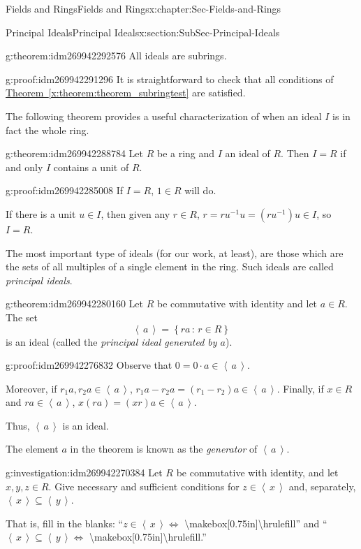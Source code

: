 \documentclass[oneside,10pt,]{book}
\numberwithin{equation}{section}
\newcommand{\ideal}[1]{\left\langle\, #1 \,\right\rangle}
\newcommand{\setof}[2]{{\left\{#1\,\colon\,#2\right\}}}
\begin{document}
\begin{chapterptx}{Fields and Rings}{}{Fields and Rings}{}{}{x:chapter:Sec-Fields-and-Rings}
\begin{sectionptx}{Principal Ideals}{}{Principal Ideals}{}{}{x:section:SubSec-Principal-Ideals}
\begin{theorem}{}{}{g:theorem:idm269942292576}
All ideals are subrings.%
\end{theorem}
\begin{proofptx}{}{g:proof:idm269942291296}
It is straightforward to check that all conditions of \hyperref[x:theorem:theorem_subringtest]{Theorem~\ref{x:theorem:theorem_subringtest}} are satisfied.%
\end{proofptx}
The following theorem provides a useful characterization of when an ideal \(I\) is in fact the whole ring.%
\begin{theorem}{}{}{g:theorem:idm269942288784}%
Let \(R\) be a ring and \(I\) an ideal of \(R\). Then \(I = R\) if and only \(I\) contains a unit of \(R\).%
\end{theorem}
\begin{proofptx}{}{g:proof:idm269942285008}
If \(I = R\), \(1\in R\) will do.%
\par
If there is a unit \(u\in I\), then given any \(r\in R\), \(r = r u^{-1} u = (ru^{-1}) u \in I\), so \(I = R\).%
\end{proofptx}
The most important type of ideals (for our work, at least), are those which are the sets of all multiples of a single element in the ring. Such ideals are called \emph{principal ideals}.%
\begin{theorem}{}{}{g:theorem:idm269942280160}%
Let \(R\) be commutative with identity and let \(a\in R\). The set%
\begin{equation*}
\ideal{a} = \setof{ra}{r\in R}
\end{equation*}
is an ideal (called the \emph{principal ideal generated by \(a\)}).%
\end{theorem}
\begin{proofptx}{}{g:proof:idm269942276832}
Observe that \(0 = 0\cdot a \in \ideal{a}\).%
\par
Moreover, if \(r_1 a, r_2 a\in \ideal{a}\), \(r_1 a - r_2 a = (r_1 - r_2)a \in \ideal{a}\). Finally, if \(x\in R\) and \(r a\in \ideal{a}\), \(x (ra) = (xr) a \in \ideal{a}\).%
\par
Thus, \(\ideal{a}\) is an ideal.%
\end{proofptx}
The element \(a\) in the theorem is known as the \emph{generator} of \(\ideal{a}\).%
\begin{investigation}{}{g:investigation:idm269942270384}%
Let \(R\) be commutative with identity, and let \(x,y,z\in R\). Give necessary and sufficient conditions for \(z\in \ideal{x}\) and, separately, \(\ideal{x} \subseteq \ideal{y}\).%
\par
That is, fill in the blanks: ``\(z\in \ideal{x} \Leftrightarrow\) \textbackslash{}makebox[0.75in]\textbraceleft{}\textbackslash{}hrulefill\textbraceright{}'' and ``\(\ideal{x}\subseteq \ideal{y} \Leftrightarrow\) \textbackslash{}makebox[0.75in]\textbraceleft{}\textbackslash{}hrulefill\textbraceright{}.''%

\end{investigation}
\end{sectionptx}
\end{chapterptx}
\end{document}

